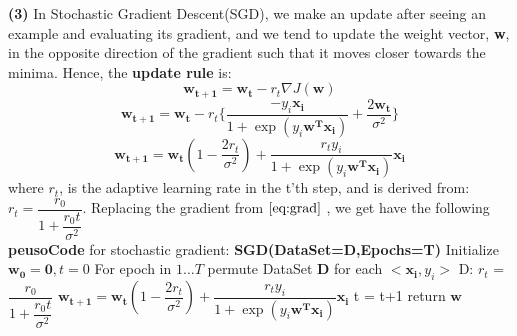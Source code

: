 \documentclass{article}
\renewcommand\part[1]{\vspace{.10in}\textbf{(#1)}}
\begin{document}
	\part{3} In Stochastic Gradient Descent(SGD), we make an update after seeing an example and evaluating its gradient, and we tend to update the weight vector, \textbf{w}, in the opposite direction of the gradient such that it moves closer towards the minima. Hence, the \textbf {update rule} is:
	\[ \mathbf{w_{t+1}} = \mathbf{w_t} - r_t \nabla J(\mathbf{w}) \]
	\[ \mathbf{w_{t+1}} = \mathbf{w_t} - r_t\{ \dfrac{-y_i\mathbf{x_i}}{1 + \exp(y_i\mathbf{w^Tx_i})} + \dfrac{2\mathbf{w_t}}{\sigma^2}\}\]
	\[ \mathbf{w_{t+1}} = \mathbf{w_t}(1 - \dfrac{2r_t}{\sigma^2}) + \dfrac{r_t y_i}{1 + \exp(y_i\mathbf{w^Tx_i})}\mathbf{x_i} \]
	where $r_t$, is the adaptive learning rate in the t'th step, and is derived from: $r_t = \dfrac{r_0}{1 + \dfrac{r_0t}{\sigma^2}}$. Replacing the gradient from $\eqref{eq:grad}$ , we get have the following \textbf {peusoCode} for stochastic gradient: \newline
	\textbf{SGD(DataSet=D,Epochs=T)} \newline
	\hspace*{0.5cm} Initialize $\mathbf{w_0 = 0}, t = 0$ \newline
	\hspace*{0.5cm} For epoch in $1 \dots T$ \newline
	\hspace*{1.0cm}    permute DataSet \textbf{D} \newline
	\hspace*{1.0cm}    for each $<\mathbf{x_i},y_i>$ D: \newline
	\hspace*{1.5cm}    	$r_t$ = $\dfrac{r_0}{1 + \dfrac{r_0t}{\sigma^2}}$ \newline
	\hspace*{1.5cm}		$ \mathbf{w_{t+1}} = \mathbf{w_t}(1 - \dfrac{2r_t}{\sigma^2}) + \dfrac{r_t y_i}{1 + \exp(y_i\mathbf{w^Tx_i})}\mathbf{x_i} $ \newline
	\hspace*{1.5cm}		t = t+1 \newline
	\hspace*{0.5cm} return $\mathbf{w}$
\end{document}
